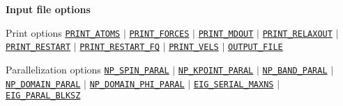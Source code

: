 \begin{frame}[allowframebreaks]{\textbf{Input file options}}
\begin{block}{Print options}
\hyperlink{PRINT_ATOMS}{\texttt{PRINT\_ATOMS}} $\vert$ \hyperlink{PRINT_FORCES}{\texttt{PRINT\_FORCES}} $\vert$ \hyperlink{PRINT_MDOUT}{\texttt{PRINT\_MDOUT}} $\vert$ \hyperlink{PRINT_RELAXOUT}{\texttt{PRINT\_RELAXOUT}} $\vert$ \hyperlink{PRINT_RESTART}{\texttt{PRINT\_RESTART}} $\vert$ \hyperlink{PRINT_RESTART_FQ}{\texttt{PRINT\_RESTART\_FQ}} $\vert$ \hyperlink{PRINT_VELS}{\texttt{PRINT\_VELS}} $\vert$ \hyperlink{OUTPUT_FILE}{\texttt{OUTPUT\_FILE}}
\end{block}

\begin{block}{Parallelization options}
\hyperlink{NP_SPIN_PARAL}{\texttt{NP\_SPIN\_PARAL}} $\vert$ \hyperlink{NP_KPOINT_PARAL}{\texttt{NP\_KPOINT\_PARAL}} $\vert$ \hyperlink{NP_BAND_PARAL}{\texttt{NP\_BAND\_PARAL}} $\vert$ \hyperlink{NP_DOMAIN_PARAL}{\texttt{NP\_DOMAIN\_PARAL}} $\vert$ \hyperlink{NP_DOMAIN_PHI_PARAL}{\texttt{NP\_DOMAIN\_PHI\_PARAL}} $\vert$ \hyperlink{EIG_SERIAL_MAXNS}{\texttt{EIG\_SERIAL\_MAXNS}} $\vert$ \hyperlink{EIG_PARAL_BLKSZ}{\texttt{EIG\_PARAL\_BLKSZ}}
\end{block}

\end{frame}
